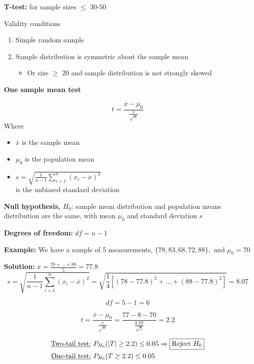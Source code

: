 \documentclass[12pt, letterpaper]{article}
\begin{document}
    \textbf{T-test:} for sample sizes $\leq$ 30-50 \bigskip

    Validity conditions
    \begin{enumerate}
        \item Simple random sample
        \item Sample distribution is symmetric about the sample mean
        \begin{itemize}
            \item Or size $\geq$ 20 and sample distribution is not strongly skewed
        \end{itemize}
    \end{enumerate}\bigskip

    \textbf{One sample mean test}

    \begin{multicols}{2}
        \vfill\null$$\boxed{t=\frac{\overline{x}-\mu_0}{\frac{s}{\sqrt{n}}}}$$
        \vfill\null\columnbreak
        Where
        \begin{itemize}
            \item $\overline{x}$ is the sample mean
            \item $\mu_0$ is the population mean
            \item $s=\sqrt{\frac{1}{n-1}\sum_{i=1}^{n} (x_i-\overline{x})^2}$\\
            is the unbiased standard deviation
        \end{itemize}
    \end{multicols}

    \textbf{Null hypothesis, $H_0$}: sample mean distribution and population means distribution are the same, with mean $\mu_0$ and standard deviation $s$\bigskip

    \textbf{Degrees of freedom:} $df=n-1$ \bigskip\bigskip

    \textbf{Example:} We have a sample of 5 measurements, $\{78, 83, 68, 72, 88\}, \text{ and } \mu_0=70$ \bigskip

    \textbf{Solution:} $\overline{x}=\frac{78+...+88}{5}=\boxed{77.8}$
    $$s=\sqrt{\frac{1}{n-1}\sum_ {i=1}^{n} (x_i-\overline{x})^2}= \sqrt{\frac{1}{4}[(78-77.8)^2+...+(88-77.8)^2]} = \boxed{8.07} $$

    $$df=5-1=\boxed{6}$$

    $$t=\frac{\overline{x}-\mu_0}{\frac{s}{\sqrt{n}}} = \frac{77-8-70}{\frac{8.07}{\sqrt{5}}} = \boxed{2.2}$$

    \begin{align*}
        \text{\underline{Two-tail test:} } &P_{H_0}(|T|\geq2.2)\leq0.05\Rightarrow\boxed{\text{Reject } H_0} \\
        \text{\underline{One-tail test:} } &P_{H_0}(T\geq2.2)\leq0.05
    \end{align*}
    

    
\end{document}

